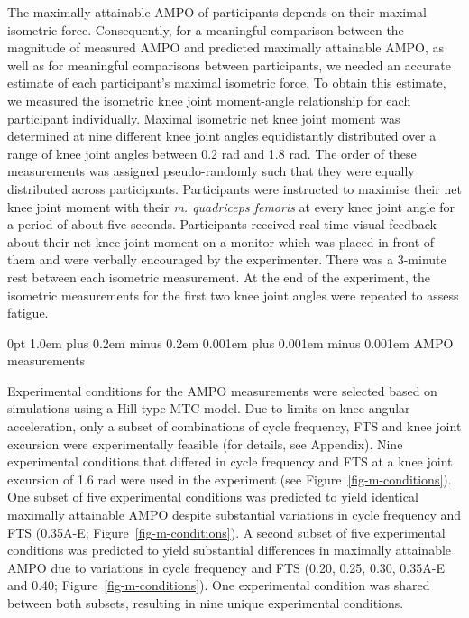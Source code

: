 \documentclass[
  11pt,
  a4paper]{article}
\makeatletter
\renewcommand{\subsubsection}{%
  \@startsection{subsubsection}{3}
    {0pt} 					%
    {1.0em plus 0.2em minus 0.2em} 	%
    {0.001em plus 0.001em minus 0.001em}    	%
    {\normalsize\bfseries\sffamily}%
}
\makeatother
\begin{document}
The maximally attainable AMPO of participants depends on their maximal
isometric force. Consequently, for a meaningful comparison between the
magnitude of measured AMPO and predicted maximally attainable AMPO, as
well as for meaningful comparisons between participants, we needed an
accurate estimate of each participant's maximal isometric force. To
obtain this estimate, we measured the isometric knee joint moment-angle
relationship for each participant individually. Maximal isometric net
knee joint moment was determined at nine different knee joint angles
equidistantly distributed over a range of knee joint angles between 0.2
rad and 1.8 rad. The order of these measurements was assigned
pseudo-randomly such that they were equally distributed across
participants. Participants were instructed to maximise their net knee
joint moment with their \emph{m. quadriceps femoris} at every knee joint
angle for a period of about five seconds. Participants received
real-time visual feedback about their net knee joint moment on a monitor
which was placed in front of them and were verbally encouraged by the
experimenter. There was a 3-minute rest between each isometric
measurement. At the end of the experiment, the isometric measurements
for the first two knee joint angles were repeated to assess fatigue.

\subsubsection{AMPO measurements}\label{sec-m-ampo}

Experimental conditions for the AMPO measurements were selected based on
simulations using a Hill-type MTC model. Due to limits on knee angular
acceleration, only a subset of combinations of cycle frequency, FTS and
knee joint excursion were experimentally feasible (for details, see
Appendix). Nine experimental conditions that differed in cycle frequency
and FTS at a knee joint excursion of 1.6 rad were used in the experiment
(see Figure~\ref{fig-m-conditions}). One subset of five experimental
conditions was predicted to yield identical maximally attainable AMPO
despite substantial variations in cycle frequency and FTS (0.35A-E;
Figure~\ref{fig-m-conditions}). A second subset of five experimental
conditions was predicted to yield substantial differences in maximally
attainable AMPO due to variations in cycle frequency and FTS (0.20,
0.25, 0.30, 0.35A-E and 0.40; Figure~\ref{fig-m-conditions}). One
experimental condition was shared between both subsets, resulting in
nine unique experimental conditions.
\end{document}
